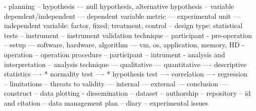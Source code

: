 - planning
-- hypothesis
--- null hypothesis, alternative hypothesis
-- variable dependent/independent
--- dependent variable metric
--- experimental unit
--- independent variable: factor, fixed; treatment, control
-- design type: statistical tests
-- instrument
-- instrument validation technique
-- participant
- pre-operation
-- setup
--- software, hardware, algorithm
--- vm, os, application, memory, HD
- operation
-- operation procedure
-- participant
-- intrument
- analysis and interpretation
-- analysis technique
--- qualitative
--- quantitative
---- descriptive statistics
---- * normality test
---- * hypothesis test
---- correlation
---- regression
-- limitations
-- threats to validity
--- internal
--- external
--- conclusion
--- construct
-- data plotting
- dissemination
-- dataset
-- authorship
-- repository
-- id and citation
-- data management plan
-- diary
-- experimental issues
